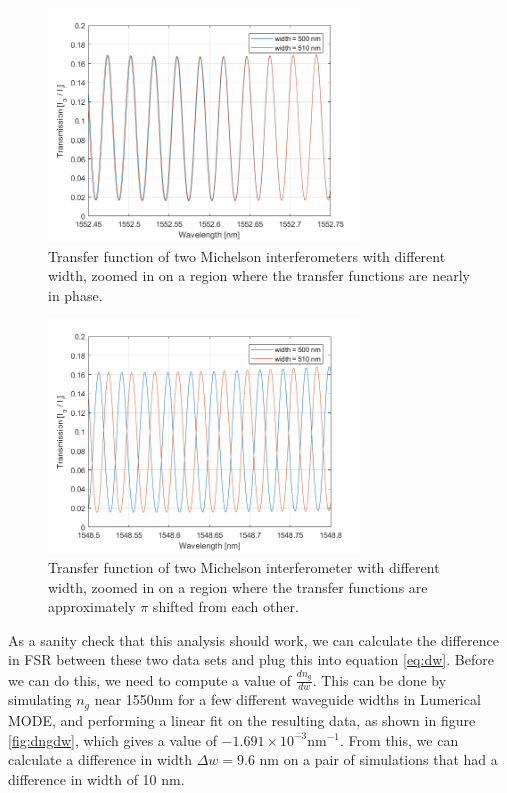 \documentclass[journal]{IEEEtran}
\begin{document}
\begin{figure}[t!]
  \centering
  \includegraphics[width = 3.25in]{fig/michaelson_in-phase.png}
  \caption{Transfer function of two Michelson interferometers with different width, zoomed in on a region where the transfer functions are nearly in phase.}
  \label{fig:mich-in}
\end{figure}

\begin{figure}[t!]
  \centering
  \includegraphics[width = 3.25in]{fig/michaelson_out-of-phase.png}
  \caption{Transfer function of two Michelson interferometer with different width, zoomed in on a region where the transfer functions are approximately $\pi$ shifted from each other.}
  \label{fig:mich-out}
\end{figure}

As a sanity check that this analysis should work, we can calculate the difference in FSR between these two data sets and plug this into equation \ref{eq:dw}. Before we can do this, we need to compute a value of $\frac{dn_g}{dw}$. This can be done by simulating $n_g$ near 1550nm for a few different waveguide widths in Lumerical MODE, and performing a linear fit on the resulting data, as shown in figure \ref{fig:dngdw}, which gives a value of $-1.691 \times 10^{-3} \text{nm}^{-1}$. From this, we can calculate a difference in width $\Delta w = 9.6$ nm on a pair of simulations that had a difference in width of 10 nm.
\end{document}
